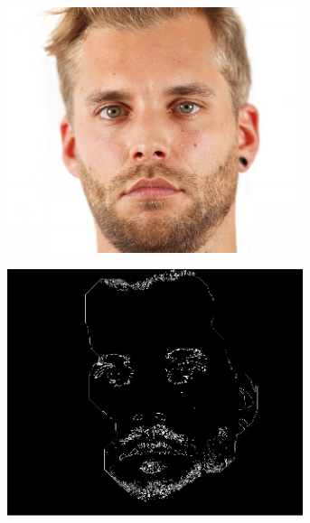 \begin{figure}[H]
\centering

\begin{subfigure}{.25\textwidth}
  \centering
  \includegraphics[width=0.95\textwidth]{img/fd3/fail4_input.jpg}
  \caption{}
\end{subfigure}%
\begin{subfigure}{.25\textwidth}
  \centering
  \includegraphics[width=0.95\textwidth]{img/fd3/fail4_faceBorder.png}
  \caption{}
\end{subfigure}%
\begin{subfigure}{.25\textwidth}
  \centering

\end{subfigure}
\end{figure}
